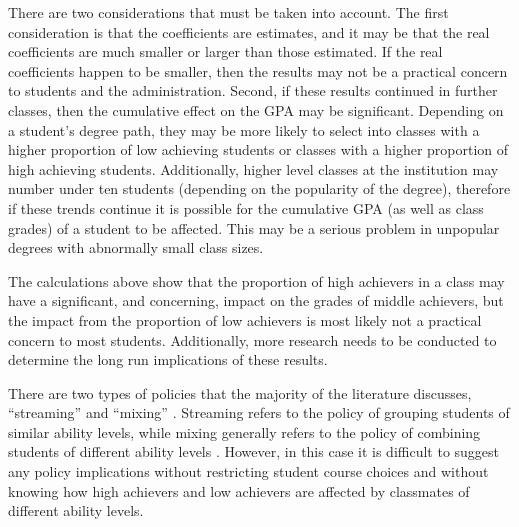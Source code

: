 There are two considerations that must be taken into account.
The first consideration is that the coefficients are estimates, and it may be that the real coefficients are much smaller or larger than those estimated. 
If the real coefficients happen to be smaller, then the results may not be a practical concern to students and the administration.
Second, if these results continued in further classes, then the cumulative effect on the GPA may be significant. 
Depending on a student's degree path, they may be more likely to select into classes with a higher proportion of low achieving students or classes with a higher proportion of high achieving students. 
Additionally, higher level classes at the institution may number under ten students (depending on the popularity of the degree), therefore if these trends continue it is possible for the cumulative GPA (as well as class grades) of a student to be affected. 
This may be a serious problem in unpopular degrees with abnormally small class sizes. 

The calculations above show that the proportion of high achievers in a class may have a significant, and concerning, impact on the grades of middle achievers, but the impact from the proportion of low achievers is most likely not a practical concern to most students. 
Additionally, more research needs to be conducted to determine the long run implications of these results. 

There are two types of policies that the majority of the literature discusses, ``streaming'' and ``mixing'' \citep{ding2007peers,kang2007classroom,carman2012classroom}. 
Streaming refers to the policy of grouping students of similar ability levels, while mixing generally refers to the policy of combining students of different ability levels \citep{ding2007peers}.
However, in this case it is difficult to suggest any policy implications without restricting student course choices and without knowing how high achievers and low achievers are affected by classmates of different ability levels. 

